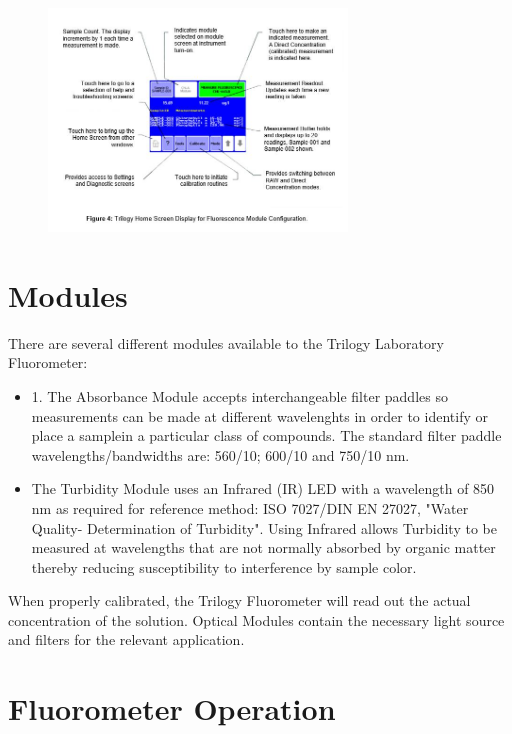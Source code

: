 \documentclass[12pt]{../SOP3_beta}
\begin{document}
  \begin{figure}
\includegraphics[width=300]{"Capture4.JPG"}
\end{figure}
 
 
\section{Modules}
\NP There are several different modules available to the Trilogy Laboratory Fluorometer:

\begin{itemize}
  \item 1. The Absorbance Module accepts interchangeable filter paddles so measurements can be made at different wavelenghts in order to identify or place a samplein a particular class of compounds. The standard filter paddle wavelengths/bandwidths are: 560/10; 600/10 and 750/10 nm.
  \item The Turbidity Module uses an Infrared (IR) LED with a wavelength of 850 nm as required for reference method: ISO 7027/DIN EN 27027, "Water Quality- Determination of Turbidity". Using Infrared allows Turbidity to be measured at wavelengths that are not normally absorbed by organic matter thereby reducing susceptibility to interference by sample color. 
\end{itemize}

\NP When properly calibrated, the Trilogy Fluorometer will read out the actual concentration of the solution. Optical Modules contain the necessary light source and filters for the relevant application. 

\section{Fluorometer Operation}
\end{document}

